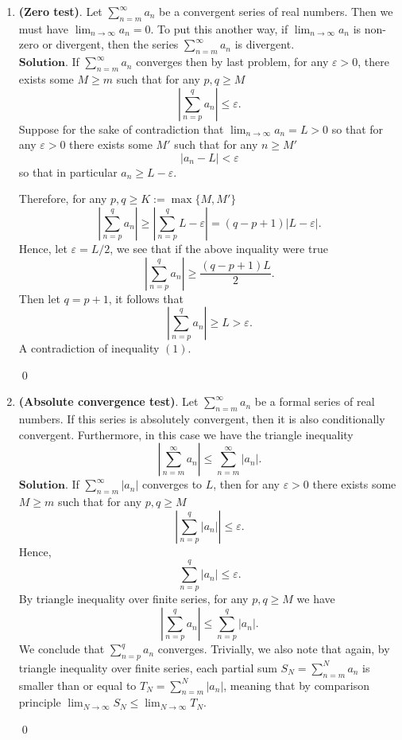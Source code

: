 \documentclass{article}
\theoremstyle{remark}
\begin{document}
\begin{enumerate}
    \item \textbf{(Zero test)}. Let \( \sum_{n=m}^{\infty} a_n \) be a convergent series of real numbers. Then we must have \( \lim_{n \to \infty} a_n = 0 \). To put this another way, if \( \lim_{n \to \infty} a_n \) is non-zero or divergent, then the series \( \sum_{n=m}^{\infty} a_n \) is divergent.
    \\$\textbf{Solution.}$
    If $\sum_{n=m}^{\infty}a_n$ converges then by last problem, for any $\varepsilon > 0$, there exists some $M \geq m$ such that for any $p,q \geq M$
    \begin{equation}
        \left \lvert \sum_{n=p}^{q} a_n \right\rvert \leq \varepsilon.
    \end{equation}
    Suppose for the sake of contradiction that $\lim_{n\to\infty}a_n = L > 0$ so that for any $\varepsilon > 0$ there exists 
    some $M'$ such that for any $n \geq M'$ 
    \[
    \vert a_n - L \vert < \varepsilon
    \]
    so that in particular $a_n \geq L-\varepsilon$.

    Therefore, for any $p,q \geq K := \max\{M, M'\}$
    \[
    \left \lvert \sum_{n=p}^{q} a_n \right\rvert \geq \left| \sum_{n=p}^{q} L- \varepsilon \right| = (q-p+1)\left| L - \varepsilon \right|.
    \]
    Hence, let $\varepsilon = L/2$, we see that if the above inquality were true 
    \[
    \left \lvert \sum_{n=p}^{q} a_n \right\rvert \geq \frac{(q-p+1)L}{2}.
    \]
    Then let $q = p+1$, it follows that 
    \[
        \left \lvert \sum_{n=p}^{q} a_n \right\rvert \geq L > \varepsilon. 
    \]
    A contradiction of inequality $(1)$.
    \begin{flushright}
        \qed
    \end{flushright}

    \item \textbf{(Absolute convergence test)}. Let \( \sum_{n=m}^{\infty} a_n \) be a formal series of real numbers. If this series is absolutely convergent, then it is also conditionally convergent. Furthermore, in this case we have the triangle inequality
    \[
    \left| \sum_{n=m}^{\infty} a_n \right| \leq \sum_{n=m}^{\infty} |a_n|.
    \]
    $\textbf{Solution.}$
    If $\sum_{n=m}^{\infty}\vert a_n \vert$ converges to $L$, then for any $\varepsilon > 0$ there exists some 
    $M \geq m$ such that for any $p,q \geq M$
    \[
    \left\lvert \sum_{n=p}^{q}\vert a_n \vert \right\rvert \leq \varepsilon.
    \]
    Hence, 
    \[
    \sum_{n=p}^{q}\vert a_n \vert \leq \varepsilon.
    \]
    By triangle inequality over finite series, for any $p,q \geq M$ we have
    \[
    \left\lvert \sum_{n=p}^{q} a_n \right\rvert \leq \sum_{n=p}^{q}\vert a_n \vert.
    \]
    We conclude that $\sum_{n=p}^{q}a_n$ converges. Trivially, we also note that again, by triangle inequality over 
    finite series, each partial sum $S_N = \sum_{n=m}^{N}a_n$ is smaller than or equal to $T_N = \sum_{n=m}^{N}\vert a_n \vert$,
    meaning that by comparison principle $\lim_{N\to\infty}S_N \leq \lim_{N\to\infty}T_N$.
    \begin{flushright}
        \qed
    \end{flushright}


\end{enumerate}
\end{document}

